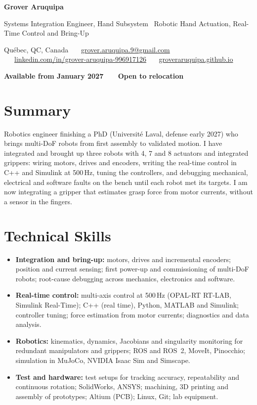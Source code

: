 \documentclass[10pt,letterpaper]{article}
\begin{document}
{\LARGE\bfseries Grover Aruquipa}\par\vspace{2pt}
{\large Systems Integration Engineer, Hand Subsystem \textbar\ Robotic Hand Actuation, Real-Time Control and Bring-Up}\par\vspace{3pt}
{\small Qu\'ebec, QC, Canada \ \textbullet\ \
\href{mailto:grover.aruquipa.9@gmail.com}{grover.aruquipa.9@gmail.com} \ \textbullet\ \
\href{https://www.linkedin.com/in/grover-aruquipa-996917126}{linkedin.com/in/grover-aruquipa-996917126} \ \textbullet\ \
\href{https://groveraruquipa.github.io}{groveraruquipa.github.io}}\par\vspace{1pt}
{\small\bfseries Available from January 2027 \ \textbullet\ \ Open to relocation}\par


\section{Summary}
Robotics engineer finishing a PhD (Universit\'e Laval, defense early 2027) who brings multi-DoF robots from first
assembly to validated motion. I have integrated and brought up three robots with 4, 7 and 8 actuators and integrated
grippers: wiring motors, drives and encoders, writing the real-time control in C++ and Simulink at 500\,Hz, tuning the
controllers, and debugging mechanical, electrical and software faults on the bench until each robot met its targets.
I am now integrating a gripper that estimates grasp force from motor currents, without a sensor in the fingers.

\section{Technical Skills}
\begin{itemize}
\item \textbf{Integration and bring-up:} motors, drives and incremental encoders; position and current sensing; first
power-up and commissioning of multi-DoF robots; root-cause debugging across mechanics, electronics and software.
\item \textbf{Real-time control:} multi-axis control at 500\,Hz (OPAL-RT RT-LAB, Simulink Real-Time); C++ (real time),
Python, MATLAB and Simulink; controller tuning; force estimation from motor currents; diagnostics and data analysis.
\item \textbf{Robotics:} kinematics, dynamics, Jacobians and singularity monitoring for redundant manipulators and grippers;
ROS and ROS~2, MoveIt, Pinocchio; simulation in MuJoCo, NVIDIA Isaac Sim and Simscape.
\item \textbf{Test and hardware:} test setups for tracking accuracy, repeatability and continuous rotation; SolidWorks,
ANSYS; machining, 3D printing and assembly of prototypes; Altium (PCB); Linux, Git; lab equipment.
\end{itemize}
\end{document}
